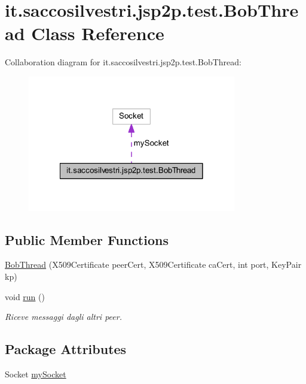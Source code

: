 \hypertarget{classit_1_1saccosilvestri_1_1jsp2p_1_1test_1_1_bob_thread}{
\section{it.saccosilvestri.jsp2p.test.\-Bob\-Thread \-Class \-Reference}
\label{classit_1_1saccosilvestri_1_1jsp2p_1_1test_1_1_bob_thread}
}


\-Collaboration diagram for it.saccosilvestri.jsp2p.test.\-Bob\-Thread\-:
\nopagebreak
\begin{figure}[H]
\begin{center}
\leavevmode
\includegraphics[width=258pt]{classit_1_1saccosilvestri_1_1jsp2p_1_1test_1_1_bob_thread__coll__graph}
\end{center}
\end{figure}
\subsection*{\-Public \-Member \-Functions}
\begin{DoxyCompactItemize}
\item 
\hyperlink{classit_1_1saccosilvestri_1_1jsp2p_1_1test_1_1_bob_thread_aeed59d278050c332dcc442a3819b1342}{\-Bob\-Thread} (\-X509\-Certificate peer\-Cert, \-X509\-Certificate ca\-Cert, int port, \-Key\-Pair kp)
\item 
void \hyperlink{classit_1_1saccosilvestri_1_1jsp2p_1_1test_1_1_bob_thread_ae9866d921fa3d15081060df6c9e873e9}{run} ()
\begin{DoxyCompactList}\small\item\em \-Riceve messaggi dagli altri peer. \end{DoxyCompactList}\end{DoxyCompactItemize}
\subsection*{\-Package \-Attributes}
\begin{DoxyCompactItemize}
\item 
\-Socket \hyperlink{classit_1_1saccosilvestri_1_1jsp2p_1_1test_1_1_bob_thread_ad788d045c926c3c835dbadc54e3d0c12}{my\-Socket}
\end{DoxyCompactItemize}



